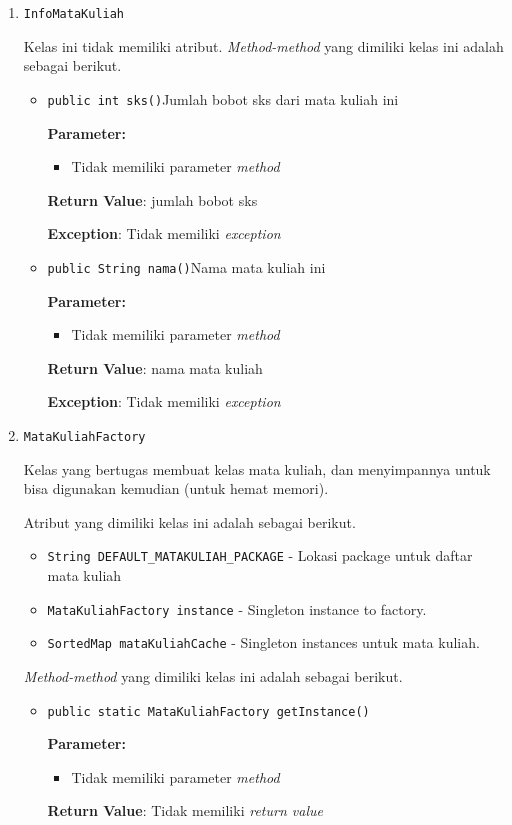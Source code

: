 \documentclass{article}
\begin{document}
\begin{enumerate}
\item \texttt{InfoMataKuliah}



Kelas ini tidak memiliki atribut. \textit{Method-method} yang dimiliki kelas ini adalah sebagai berikut.
\begin{itemize}
\item \texttt{public int sks()}Jumlah bobot sks dari mata kuliah ini

\textbf{Parameter:}
\begin{itemize}
\item Tidak memiliki parameter \textit{method}
\end{itemize}
\textbf{Return Value}: jumlah bobot sks

\textbf{Exception}: Tidak memiliki \textit{exception}

\item \texttt{public String nama()}Nama mata kuliah ini

\textbf{Parameter:}
\begin{itemize}
\item Tidak memiliki parameter \textit{method}
\end{itemize}
\textbf{Return Value}: nama mata kuliah

\textbf{Exception}: Tidak memiliki \textit{exception}

\end{itemize}
\item \texttt{MataKuliahFactory}

Kelas yang bertugas membuat kelas mata kuliah, dan menyimpannya untuk bisa
 digunakan kemudian (untuk hemat memori).

Atribut yang dimiliki kelas ini adalah sebagai berikut.
\begin{itemize}
\item \texttt{String DEFAULT\_MATAKULIAH\_PACKAGE} - Lokasi package untuk daftar mata kuliah
\item \texttt{MataKuliahFactory instance} - Singleton instance to factory.
\item \texttt{SortedMap mataKuliahCache} - Singleton instances untuk mata kuliah.
\end{itemize}
\textit{Method-method} yang dimiliki kelas ini adalah sebagai berikut.
\begin{itemize}
\item \texttt{public static MataKuliahFactory getInstance()}

\textbf{Parameter:}
\begin{itemize}
\item Tidak memiliki parameter \textit{method}
\end{itemize}
\textbf{Return Value}: Tidak memiliki \textit{return value}


\end{itemize}
\end{enumerate}
\end{document}
